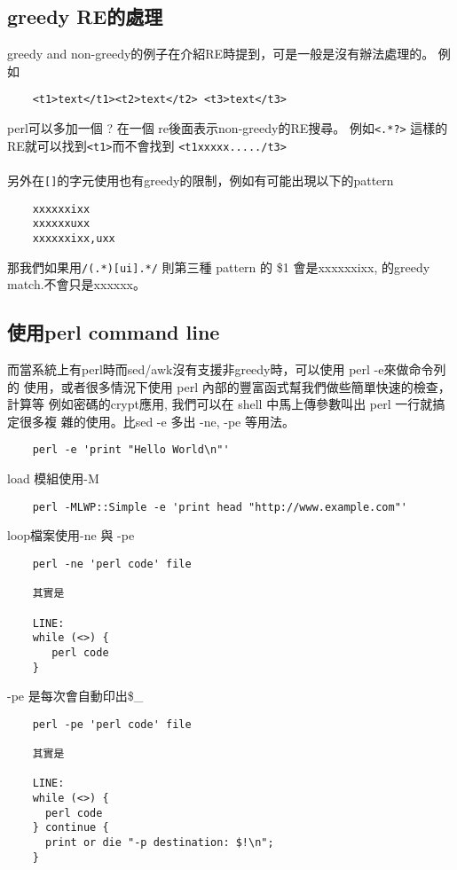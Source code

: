     \subsection{greedy RE的處理}
    greedy and non-greedy的例子在介紹RE時提到，可是一般是沒有辦法處理的。
    例如
    \begin{verbatim}
    <t1>text</t1><t2>text</t2> <t3>text</t3>
    \end{verbatim}
    perl可以多加一個 ? 在一個 re後面表示non-greedy的RE搜尋。
    例如\verb=<.*?>= 這樣的RE就可以找到\verb=<t1>=而不會找到
    \verb=<t1xxxxx...../t3>=
    \\\\
    另外在\verb=[]=的字元使用也有greedy的限制，例如有可能出現以下的pattern
    \begin{verbatim}
    xxxxxxixx
    xxxxxxuxx
    xxxxxxixx,uxx
    \end{verbatim}
    那我們如果用\verb=/(.*)[ui].*/= 則第三種 pattern 的 \$1 會是xxxxxxixx,
    的greedy match.不會只是xxxxxx。

    \subsection{使用perl command line}
    而當系統上有perl時而sed/awk沒有支援非greedy時，可以使用 perl -e來做命令列的
    使用，或者很多情況下使用 perl 內部的豐富函式幫我們做些簡單快速的檢查，計算等
    例如密碼的crypt應用, 我們可以在 shell 中馬上傳參數叫出 perl 一行就搞定很多複
    雜的使用。比sed -e 多出 -ne, -pe 等用法。　
    \begin{verbatim}
    perl -e 'print "Hello World\n"'
    \end{verbatim}

    load 模組使用-M
    \begin{verbatim}
    perl -MLWP::Simple -e 'print head "http://www.example.com"'
    \end{verbatim}

    loop檔案使用-ne 與 -pe
    \begin{verbatim}
    perl -ne 'perl code' file
    
    其實是

    LINE:
    while (<>) {
       perl code
    }
    \end{verbatim}

    -pe 是每次會自動印出\$\_
    \begin{verbatim}
    perl -pe 'perl code' file

    其實是

    LINE:
    while (<>) {
      perl code
    } continue {
      print or die "-p destination: $!\n";
    }
    \end{verbatim}

